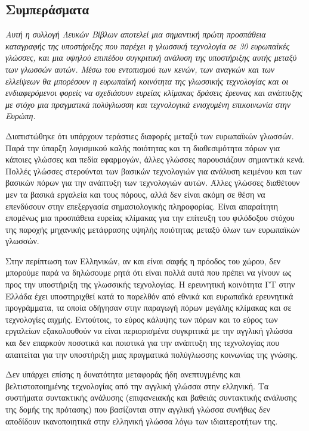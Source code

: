 \begin{multicols}{2}
\subsection{Συμπεράσματα}

\emph{Αυτή η συλλογή Λευκών Βίβλων αποτελεί μια σημαντική πρώτη προσπάθεια καταγραφής της υποστήριξης που παρέχει η γλωσσική τεχνολογία σε 30 ευρωπαϊκές γλώσσες, και μια υψηλού επιπέδου συγκριτική ανάλυση της υποστήριξης αυτής μεταξύ των γλωσσών αυτών. Μέσω του εντοπισμού των κενών, των αναγκών και των ελλείψεων θα μπορέσουν η  ευρωπαϊκή κοινότητα της γλωσσικής τεχνολογίας και οι ενδιαφερόμενοι φορείς να σχεδιάσουν ευρείας κλίμακας δράσεις έρευνας και ανάπτυξης  με στόχο μια πραγματικά πολύγλωσση και τεχνολογικά ενισχυμένη επικοινωνία στην Ευρώπη.}

Διαπιστώθηκε ότι υπάρχουν τεράστιες διαφορές μεταξύ των ευρωπαϊκών γλωσσών. Παρά την ύπαρξη λογισμικού καλής ποιότητας και τη διαθεσιμότητα πόρων για κάποιες  γλώσσες και  πεδία εφαρμογών, άλλες γλώσσες παρουσιάζουν σημαντικά κενά. Πολλές γλώσσες στερούνται των βασικών τεχνολογιών για ανάλυση κειμένου και των βασικών πόρων για την ανάπτυξη των τεχνολογιών αυτών. Άλλες γλώσσες διαθέτουν μεν τα βασικά εργαλεία και τους πόρους, αλλά δεν είναι ακόμη σε θέση να επενδύσουν στην επεξεργασία σημασιολογικής πληροφορίας. Είναι απαραίτητη επομένως μια προσπάθεια ευρείας κλίμακας για την επίτευξη του φιλόδοξου στόχου της παροχής μηχανικής μετάφρασης υψηλής ποιότητας μεταξύ όλων των ευρωπαϊκών γλωσσών.

Στην περίπτωση των Ελληνικών, αν και είναι σαφής η πρόοδος του χώρου, δεν μπορούμε παρά να δηλώσουμε ρητά ότι είναι πολλά αυτά που πρέπει να γίνουν ως προς την υποστήριξη της γλωσσικής τεχνολογίας. Η ερευνητική κοινότητα ΓΤ στην Ελλάδα έχει υποστηριχθεί κατά το παρελθόν από εθνικά και ευρωπαϊκά ερευνητικά προγράμματα, τα οποία οδήγησαν στην παραγωγή πόρων μεγάλης κλίμακας και σε τεχνολογίες αιχμής. Εντούτοις, το εύρος κάλυψης των πόρων και το εύρος των εργαλείων εξακολουθούν να είναι περιορισμένα συγκριτικά με την αγγλική γλώσσα και δεν επαρκούν ποσοτικά και ποιοτικά για την ανάπτυξη της τεχνολογίας που απαιτείται για την υποστήριξη μιας πραγματικά πολύγλωσσης κοινωνίας της γνώσης.

Δεν υπάρχει επίσης η δυνατότητα μεταφοράς ήδη ανεπτυγμένης και βελτιστοποιημένης τεχνολογίας από την αγγλική γλώσσα στην ελληνική. Τα συστήματα συντακτικής ανάλυσης (επιφανειακής και βαθειάς συντακτικής ανάλυσης της δομής της πρότασης) που βασίζονται στην αγγλική γλώσσα συνήθως δεν αποδίδουν ικανοποιητικά στην ελληνική γλώσσα λόγω των ιδιαιτεροτήτων της.


\end{multicols}
